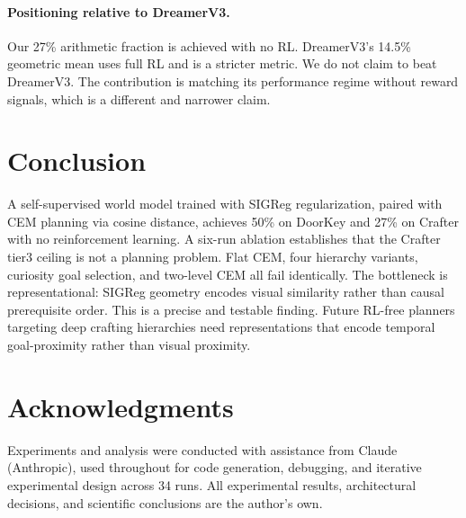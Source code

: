 \documentclass[12pt]{article}
\begin{document}
\paragraph{Positioning relative to DreamerV3.} Our 27\% arithmetic fraction is achieved with no RL. DreamerV3's 14.5\% geometric mean uses full RL and is a stricter metric. We do not claim to beat DreamerV3. The contribution is matching its performance regime without reward signals, which is a different and narrower claim.

\section{Conclusion}

A self-supervised world model trained with SIGReg regularization, paired with CEM planning via cosine distance, achieves 50\% on DoorKey and 27\% on Crafter with no reinforcement learning. A six-run ablation establishes that the Crafter tier3 ceiling is not a planning problem. Flat CEM, four hierarchy variants, curiosity goal selection, and two-level CEM all fail identically. The bottleneck is representational: SIGReg geometry encodes visual similarity rather than causal prerequisite order. This is a precise and testable finding. Future RL-free planners targeting deep crafting hierarchies need representations that encode temporal goal-proximity rather than visual proximity.

\section*{Acknowledgments}

Experiments and analysis were conducted with assistance from Claude (Anthropic), used throughout for code generation, debugging, and iterative experimental design across 34 runs. All experimental results, architectural decisions, and scientific conclusions are the author's own.



\end{document}
